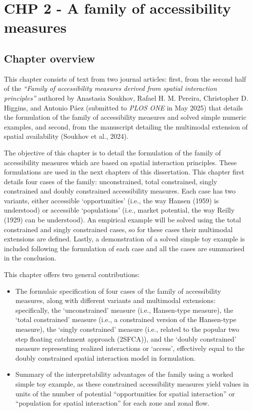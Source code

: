 \documentclass[
11pt, %
oneside, %
english, %
singlespacing, %
]{macthesis} %
\def\tightlist{}
\begin{document}
\chapter{CHP 2 - A family of accessibility measures}\label{chp-2---a-family-of-accessibility-measures}

\section{Chapter overview}\label{chapter-overview-1}

This chapter consists of text from two journal articles: first, from the second half of the \emph{``Family of accessibility measures derived from spatial interaction principles''} authored by Anastasia Soukhov, Rafael H. M. Pereira, Christopher D. Higgins, and Antonio Páez (submitted to \emph{PLOS ONE} in May 2025) that details the formulation of the family of accessibility measures and solved simple numeric examples, and second, from the manuscript detailing the multimodal extension of spatial availability (Soukhov et al., 2024).

The objective of this chapter is to detail the formulation of the family of accessibility measures which are based on spatial interaction principles. These formulations are used in the next chapters of this dissertation.
This chapter first details four cases of the family: unconstrained, total constrained, singly constrained and doubly constrained accessibility measures. Each case has two variants, either accessible `opportunities' (i.e., the way Hansen (1959) is understood) or accessible `populations' (i.e., market potential, the way Reilly (1929) can be understood). An empirical example will be solved using the total constrained and singly constrained cases, so for these cases their multimodal extensions are defined. Lastly, a demonstration of a solved simple toy example is included following the formulation of each case and all the cases are summarised in the conclusion.

This chapter offers two general contributions:

\begin{itemize}
\tightlist
\item
  The formulaic specification of four cases of the family of accessibility measures, along with different variants and multimodal extensions: specifically, the `unconstrained' measure (i.e., Hansen-type measure), the `total constrained' measure (i.e., a constrained version of the Hansen-type measure), the `singly constrained' measure (i.e., related to the popular two step floating catchment approach (2SFCA)), and the `doubly constrained' measure representing realized interactions or `access', effectively equal to the doubly constrained spatial interaction model in formulation.
\item
  Summary of the interpretability advantages of the family using a worked simple toy example, as these constrained accessibility measures yield values in units of the number of potential ``opportunities for spatial interaction'' or ``population for spatial interaction'' for each zone and zonal flow.
\end{itemize}
\end{document}
